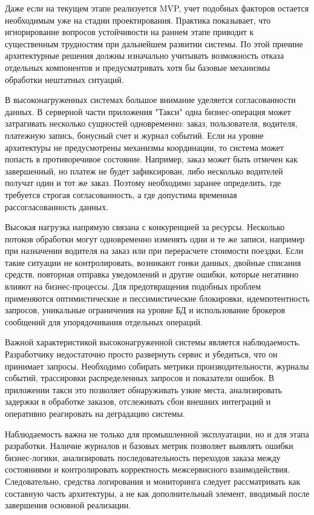 {	\par \redline Даже если на текущем этапе реализуется MVP, учет подобных факторов остается необходимым уже на стадии проектирования. Практика показывает, что игнорирование вопросов устойчивости на раннем этапе приводит к существенным трудностям при дальнейшем развитии системы. По этой причине архитектурные решения должны изначально учитывать возможность отказа отдельных компонентов и предусматривать хотя бы базовые механизмы обработки нештатных ситуаций.
	
\par \redline В высоконагруженных системах большое внимание уделяется согласованности данных. В серверной части приложения "Такси"{} одна бизнес-операция может затрагивать несколько сущностей одновременно: заказ, пользователя, водителя, платежную запись, бонусный счет и журнал событий. Если на уровне архитектуры не предусмотрены механизмы координации, то система может попасть в противоречивое состояние. Например, заказ может быть отмечен как завершенный, но платеж не будет зафиксирован, либо несколько водителей получат один и тот же заказ. Поэтому необходимо заранее определить, где требуется строгая согласованность, а где допустима временная рассогласованность данных.

\par \redline Высокая нагрузка напрямую связана с конкуренцией за ресурсы. Несколько потоков обработки могут одновременно изменять одни и те же записи, например при назначении водителя на заказ или при перерасчете стоимости поездки. Если такие ситуации не контролировать, возникают гонки данных, двойные списания средств, повторная отправка уведомлений и другие ошибки, которые негативно влияют на бизнес-процессы. Для предотвращения подобных проблем применяются оптимистические и пессимистические блокировки, идемпотентность запросов, уникальные ограничения на уровне БД и использование брокеров сообщений для упорядочивания отдельных операций.

\par \redline Важной характеристикой высоконагруженной системы является наблюдаемость. Разработчику недостаточно просто развернуть сервис и убедиться, что он принимает запросы. Необходимо собирать метрики производительности, журналы событий, трассировки распределенных запросов и показатели ошибок. В приложении такси это позволяет обнаруживать узкие места, анализировать задержки в обработке заказов, отслеживать сбои внешних интеграций и оперативно реагировать на деградацию системы.
	
	\par \redline Наблюдаемость важна не только для промышленной эксплуатации, но и для этапа разработки. Наличие журналов и базовых метрик позволяет выявлять ошибки бизнес-логики, анализировать последовательность переходов заказа между состояниями и контролировать корректность межсервисного взаимодействия. Следовательно, средства логирования и мониторинга следует рассматривать как составную часть архитектуры, а не как дополнительный элемент, вводимый после завершения основной реализации.
	
}
